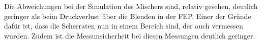 %
Die Abweichungen bei der Simulation des Mi\-schers sind, relativ gesehen, deutlich geringer als beim Druckverlust über die Blen\-den in der FEP. Einer der Gründe dafür ist, dass die Scherraten nun in einem Bereich sind, der auch vermessen wurden. 
Zudem ist die Messunsicherheit bei diesen Messungen deutlich geringer.
